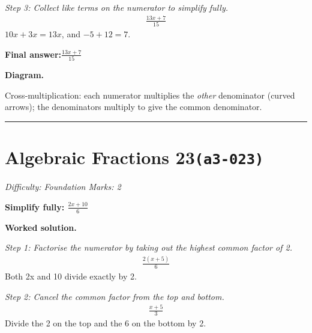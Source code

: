 \documentclass[11pt]{article}
\newcommand{\question}[1]{\par\medskip\noindent\textbf{#1}\par}
\begin{document}
\textit{Step 3: Collect like terms on the numerator to simplify fully.}
\[\begin{gathered}
\frac{13x + 7}{15}
\end{gathered}\]
\( 10x + 3x = 13x \), and \( -5 + 12 = 7 \).

\begin{answerbox}
\textbf{Final answer:}\quad \(\displaystyle \frac{13x + 7}{15}\)
\end{answerbox}
\textbf{Diagram.}

\begin{center}
\end{center}
\small Cross-multiplication: each numerator multiplies the \emph{other} denominator (curved arrows); the denominators multiply to give the common denominator.\normalsize

\medskip\hrule

\section*{Algebraic Fractions 23\quad\small\texttt{(a3-023)}}
\textit{Difficulty: Foundation \quad\textbar\quad Marks: 2}

\question{Simplify fully: \( \frac{2x+10}{6} \)}

\textbf{Worked solution.}

\textit{Step 1: Factorise the numerator by taking out the highest common factor of 2.}
\[\begin{gathered}
\frac{2(x+5)}{6}
\end{gathered}\]
Both 2x and 10 divide exactly by 2.

\textit{Step 2: Cancel the common factor from the top and bottom.}
\[\begin{gathered}
\frac{x+5}{3}
\end{gathered}\]
Divide the 2 on the top and the 6 on the bottom by 2.
\end{document}
